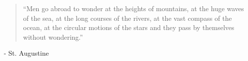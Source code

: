 \pagestyle{empty}
\vspace*{\fill}
\begin{quotation}
    ``Men go abroad to wonder at the heights of mountains, at the huge
    waves of the sea, at the long courses of the rivers, at the vast compass of
    the ocean, at the circular motions of the stars and they pass by themselves
    without wondering.''
\end{quotation}
\begin{flushright}
    - St. Augustine
\end{flushright}
\vspace*{\fill}
\newpage
